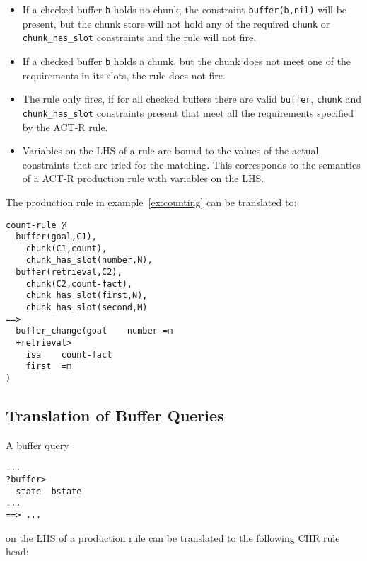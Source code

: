 \begin{itemize}
 \item If a checked buffer \verb|b| holds no chunk, the constraint \verb|buffer(b,nil)| will be present, but the chunk store will not hold any of the required \verb|chunk| or \verb|chunk_has_slot| constraints and the rule will not fire.
 \item If a checked buffer \verb|b| holds a chunk, but the chunk does not meet one of the requirements in its slots, the rule does not fire.
 \item The rule only fires, if for all checked buffers there are valid \verb|buffer|, \verb|chunk| and \verb|chunk_has_slot| constraints present that meet all the requirements specified by the ACT-R rule.
 \item Variables on the LHS of a rule are bound to the values of the actual constraints that are tried for the matching. This corresponds to the semantics of a ACT-R production rule with variables on the LHS.
\end{itemize}


\begin{example}
The production rule in example~\ref{ex:counting} can be translated to:

\begin{lstlisting}
count-rule @
  buffer(goal,C1), 
    chunk(C1,count),
    chunk_has_slot(number,N),
  buffer(retrieval,C2),
    chunk(C2,count-fact),
    chunk_has_slot(first,N),
    chunk_has_slot(second,M)
==>
  buffer_change(goal    number =m
  +retrieval>
    isa    count-fact
    first  =m
)
\end{lstlisting}

\end{example}


\subsection{Translation of Buffer Queries}

A buffer query

\begin{lstlisting}
...
?buffer>
  state  bstate 
...
==> ...
\end{lstlisting}

on the LHS of a production rule can be translated to the following CHR rule head:

